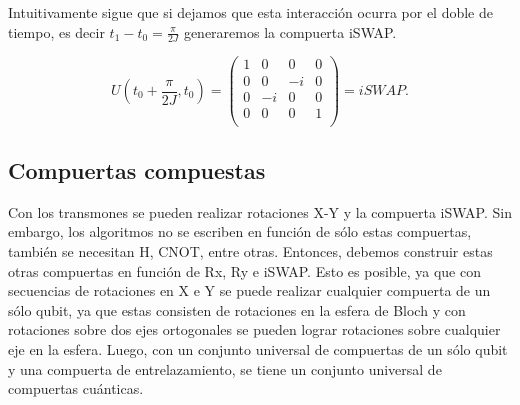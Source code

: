Intuitivamente sigue que si dejamos que esta interacción ocurra por el doble de tiempo, es decir $t_1 - t_0 = \frac{\pi}{2J}$ generaremos la compuerta iSWAP.

\begin{equation}
    U(t_0 + \frac{\pi}{2J}, t_0) = 
    \begin{pmatrix}
        1 & 0 & 0 & 0 \\
        0 & 0 & -i & 0 \\
        0 & -i & 0 & 0 \\
        0 & 0 & 0 & 1 \\
    \end{pmatrix} = iSWAP .
\end{equation}

\subsection{Compuertas compuestas}

Con los transmones se pueden realizar rotaciones X-Y y la compuerta iSWAP. Sin embargo, los algoritmos no se escriben en función de sólo estas compuertas, también se necesitan H, CNOT, entre otras. Entonces, debemos construir estas otras compuertas en función de Rx, Ry e iSWAP. Esto es posible, ya que con secuencias de rotaciones en X e Y se puede realizar cualquier compuerta de un sólo qubit, ya que estas consisten de rotaciones en la esfera de Bloch y con rotaciones sobre dos ejes ortogonales se pueden lograr rotaciones sobre cualquier eje en la esfera. Luego, con un conjunto universal de compuertas de un sólo qubit y una compuerta de entrelazamiento, se tiene un conjunto universal de compuertas cuánticas.

